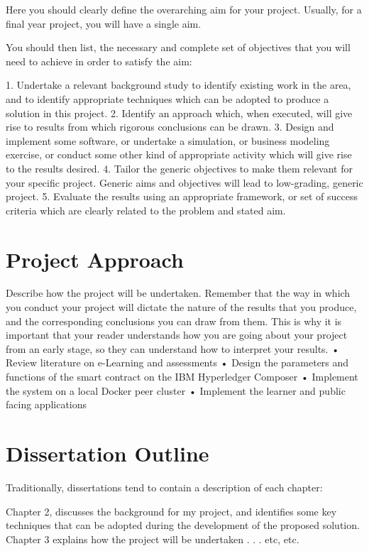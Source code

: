 Here you should clearly define the overarching aim for your project.  Usually, for a final year project, you will have a single aim.

You should then list, the necessary and complete set of objectives that you will need to achieve in order to satisfy the aim:

    1. Undertake a relevant background study to identify existing work in the area, and to identify appropriate techniques which can be adopted to produce a solution in this project.
    2. Identify an approach which, when executed, will give rise to results from which rigorous conclusions can be drawn.
    3. Design and implement some software, or undertake a simulation, or business modeling exercise, or conduct some other kind of appropriate activity which will give rise to the results desired.
    4. Tailor the generic objectives to make them relevant for your specific project.  Generic aims and objectives will lead to low-grading, generic project.
    5. Evaluate the results using an appropriate framework, or set of success criteria which are clearly related to the problem and stated aim.


\section{Project Approach} %
Describe how the project will be undertaken.  Remember that the way in which you conduct your project will dictate the nature of the results that you produce, and the corresponding conclusions you can draw from them.  This is why it is important that your reader understands how you are going about your project from an early stage, so they can understand how to interpret your results.
• Review literature on e-Learning and assessments
• Design the parameters and functions of the smart contract on the IBM Hyperledger Composer
• Implement the system on a local Docker peer cluster
• Implement the learner and public facing applications

\section{Dissertation Outline}  %
Traditionally, dissertations tend to contain a description of each chapter:

Chapter 2, discusses the background for my project, and identifies some key techniques that can be adopted during the development of the proposed solution.  Chapter 3 explains how the project will be undertaken . . . etc, etc.  

